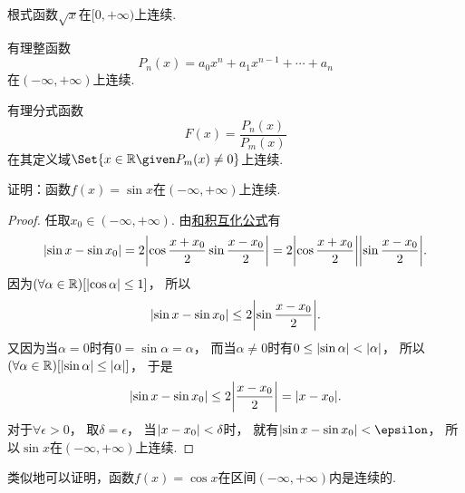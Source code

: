 \begin{example}
根式函数\(\sqrt{x}\)在\([0,+\infty)\)上连续.
\end{example}

\begin{example}
有理整函数\[
	P_n(x) = a_0 x^n + a_1 x^{n-1} + \dotsb + a_n
\]在\((-\infty,+\infty)\)上连续.
\end{example}

\begin{example}
有理分式函数\[
	F(x) = \frac{P_n(x)}{P_m(x)}
\]在其定义域\(\Set{ x\in\mathbb{R} \given P_m(x)\neq0 }\)上连续.
\end{example}

\begin{example}\label{example:极限.正弦函数在实数域上连续}
证明：函数\(f(x) = \sin x\)在\((-\infty,+\infty)\)上连续.
\begin{proof}
任取\(x_0\in(-\infty,+\infty)\).
由\hyperref[equation:函数.三角函数.和积互化公式12]{和积互化公式}有\[
	\abs{\sin x - \sin x_0}
	= 2 \abs{\cos\frac{x+x_0}2 \sin\frac{x-x_0}2}
	= 2 \abs{\cos\frac{x+x_0}2} \abs{\sin\frac{x-x_0}2}.
\]
因为\((\forall\alpha\in\mathbb{R})[\abs{\cos\alpha}\leq1]\)，
所以\[
	\abs{\sin x - \sin x_0} \leq 2 \abs{\sin\frac{x-x_0}2}.
\]
又因为当\(\alpha=0\)时有\(0=\sin\alpha=\alpha\)，
而当\(\alpha\neq0\)时有\(0\leq\abs{\sin\alpha}<\abs{\alpha}\)，
所以\((\forall\alpha\in\mathbb{R})[\abs{\sin\alpha}\leq\abs{\alpha}]\)，
于是\[
	\abs{\sin x - \sin x_0}
	\leq 2 \abs{\frac{x-x_0}2}
	= \abs{x-x_0}.
\]
对于\(\forall\epsilon>0\)，
取\(\delta=\epsilon\)，
当\(\abs{x-x_0}<\delta\)时，
就有\(\abs{\sin x-\sin x_0}<\epsilon\)，
所以\(\sin x\)在\((-\infty,+\infty)\)上连续.
\end{proof}
\end{example}

类似地可以证明，函数\(f(x) = \cos x\)在区间\((-\infty,+\infty)\)内是连续的.


